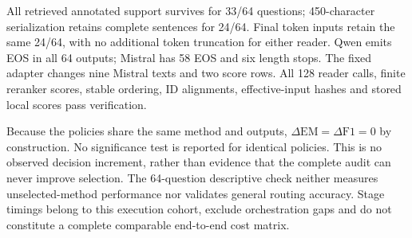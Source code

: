 All retrieved annotated support survives for 33/64 questions; 450-character serialization retains complete sentences for 24/64. Final token inputs retain the same 24/64, with no additional token truncation for either reader. Qwen emits EOS in all 64 outputs; Mistral has 58 EOS and six length stops. The fixed adapter changes nine Mistral texts and two score rows. All 128 reader calls, finite reranker scores, stable ordering, ID alignments, effective-input hashes and stored local scores pass verification.

Because the policies share the same method and outputs, $\Delta\mathrm{EM}=\Delta\mathrm{F1}=0$ by construction. No significance test is reported for identical policies. This is no observed decision increment, rather than evidence that the complete audit can never improve selection. The 64-question descriptive check neither measures unselected-method performance nor validates general routing accuracy. Stage timings belong to this execution cohort, exclude orchestration gaps and do not constitute a complete comparable end-to-end cost matrix.

\FloatBarrier
